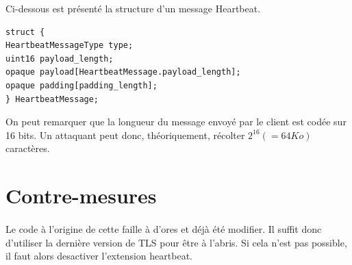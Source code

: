 Ci-dessous est présenté la structure d'un message Heartbeat.
\begin{verbatim}
struct {
HeartbeatMessageType type;
uint16 payload_length;
opaque payload[HeartbeatMessage.payload_length];
opaque padding[padding_length];
} HeartbeatMessage;
\end{verbatim}

On peut remarquer que la longueur du message envoyé par le client est codée sur 16 bits. Un attaquant peut donc, théoriquement, récolter $2^{16} (= 64Ko)$ caractères.

\section{Contre-mesures}
\paragraph{}
Le code à l'origine de cette faille à d'ores et déjà été modifier. Il suffit donc d'utiliser la dernière version de TLS pour être à l'abris. Si cela n'est pas possible, il faut alors desactiver l'extension heartbeat.
